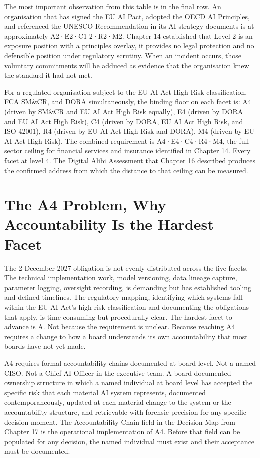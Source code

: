 The most important observation from this table is in the final row. An organisation that has signed the EU AI Pact, adopted the OECD AI Principles, and referenced the UNESCO Recommendation in its AI strategy documents is at approximately A2·E2·C1-2·R2·M2. Chapter 14 established that Level 2 is an exposure position with a principles overlay, it provides no legal protection and no defensible position under regulatory scrutiny. When an incident occurs, those voluntary commitments will be adduced as evidence that the organisation knew the standard it had not met.

For a regulated organisation subject to the EU AI Act High Risk classification, FCA SM\&CR, and DORA simultaneously, the binding floor on each facet is: A4 (driven by SM\&CR and EU AI Act High Risk equally), E4 (driven by DORA and EU AI Act High Risk), C4 (driven by DORA, EU AI Act High Risk, and ISO 42001), R4 (driven by EU AI Act High Risk and DORA), M4 (driven by EU AI Act High Risk). The combined requirement is A4·E4·C4·R4·M4, the full sector ceiling for financial services and insurance identified in Chapter 14. Every facet at level 4. The Digital Alibi Assessment that Chapter 16 described produces the confirmed address from which the distance to that ceiling can be measured.

\scenebreak

\section{The A4 Problem, Why Accountability Is the Hardest Facet}

The 2 December 2027 obligation is not evenly distributed across the five facets. The technical implementation work, model versioning, data lineage capture, parameter logging, oversight recording, is demanding but has established tooling and defined timelines. The regulatory mapping, identifying which systems fall within the EU AI Act's high-risk classification and documenting the obligations that apply, is time-consuming but procedurally clear. The hardest facet to advance is A. Not because the requirement is unclear. Because reaching A4 requires a change to how a board understands its own accountability that most boards have not yet made.

A4 requires formal accountability chains documented at board level. Not a named CISO. Not a Chief AI Officer in the executive team. A board-documented ownership structure in which a named individual at board level has accepted the specific risk that each material AI system represents, documented contemporaneously, updated at each material change to the system or the accountability structure, and retrievable with forensic precision for any specific decision moment. The Accountability Chain field in the Decision Map from Chapter 17 is the operational implementation of A4. Before that field can be populated for any decision, the named individual must exist and their acceptance must be documented.

